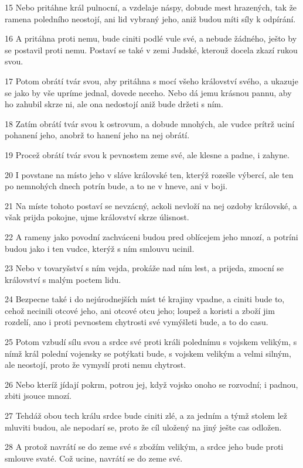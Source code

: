 \par 15 Nebo pritáhne král pulnocní, a vzdelaje náspy, dobude mest hrazených, tak že ramena poledního neostojí, ani lid vybraný jeho, aniž budou míti síly k odpírání.
\par 16 A pritáhna proti nemu, bude ciniti podlé vule své, a nebude žádného, ješto by se postavil proti nemu. Postaví se také v zemi Judské, kterouž docela zkazí rukou svou.
\par 17 Potom obrátí tvár svou, aby pritáhna s mocí všeho království svého, a ukazuje se jako by vše upríme jednal, dovede neceho. Nebo dá jemu krásnou pannu, aby ho zahubil skrze ni, ale ona nedostojí aniž bude držeti s ním.
\par 18 Zatím obrátí tvár svou k ostrovum, a dobude mnohých, ale vudce prítrž uciní pohanení jeho, anobrž to hanení jeho na nej obrátí.
\par 19 Procež obrátí tvár svou k pevnostem zeme své, ale klesne a padne, i zahyne.
\par 20 I povstane na místo jeho v sláve královské ten, kterýž rozešle výbercí, ale ten po nemnohých dnech potrín bude, a to ne v hneve, ani v boji.
\par 21 Na míste tohoto postaví se nevzácný, ackoli nevloží na nej ozdoby královské, a však prijda pokojne, ujme království skrze úlisnost.
\par 22 A rameny jako povodní zachváceni budou pred oblícejem jeho mnozí, a potríni budou jako i ten vudce, kterýž s ním smlouvu ucinil.
\par 23 Nebo v tovaryšství s ním vejda, prokáže nad ním lest, a prijeda, zmocní se království s malým poctem lidu.
\par 24 Bezpecne také i do nejúrodnejších míst té krajiny vpadne, a ciniti bude to, cehož necinili otcové jeho, ani otcové otcu jeho; loupež a koristi a zboží jim rozdelí, ano i proti pevnostem chytrosti své vymýšleti bude, a to do casu.
\par 25 Potom vzbudí sílu svou a srdce své proti králi polednímu s vojskem velikým, s nímž král polední vojensky se potýkati bude, s vojskem velikým a velmi silným, ale neostojí, proto že vymyslí proti nemu chytrost.
\par 26 Nebo kteríž jídají pokrm, potrou jej, když vojsko onoho se rozvodní; i padnou, zbiti jsouce mnozí.
\par 27 Tehdáž obou tech králu srdce bude ciniti zlé, a za jedním a týmž stolem lež mluviti budou, ale nepodarí se, proto že cíl uložený na jiný ješte cas odložen.
\par 28 A protož navrátí se do zeme své s zbožím velikým, a srdce jeho bude proti smlouve svaté. Což ucine, navrátí se do zeme své.
